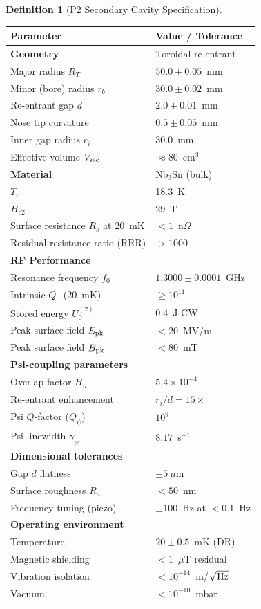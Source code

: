 \documentclass[11pt,twocolumn]{article}
\newcommand{\gpsi}{\gamma_\psi}
\newcommand{\ee}[1]{\times 10^{#1}}
\newcommand{\Qpsi}{Q_\psi}
\newcommand{\Heff}{H_n}
\theoremstyle{definition}
\newtheorem{definition}[theorem]{Definition}
\theoremstyle{remark}
\begin{document}
\begin{definition}[P2 Secondary Cavity Specification]
\label{def:p2_secondary}
\begin{center}
\renewcommand{\arraystretch}{1.2}
\begin{tabular}{@{}p{3.5cm}p{4.5cm}@{}}
\toprule
Parameter & Value / Tolerance \\
\midrule
\textbf{Geometry} & Toroidal re-entrant \\
Major radius $R_T$ & $50.0 \pm 0.05$~mm \\
Minor (bore) radius $r_b$ & $30.0 \pm 0.02$~mm \\
Re-entrant gap $d$ & $2.0 \pm 0.01$~mm \\
Nose tip curvature & $0.5 \pm 0.05$~mm \\
Inner gap radius $r_i$ & $30.0$~mm \\
Effective volume $V_{\rm sec}$ & $\approx 80$~cm$^3$ \\
\midrule
\textbf{Material} & Nb$_3$Sn (bulk) \\
$T_c$ & 18.3~K \\
$H_{c2}$ & 29~T \\
Surface resistance $R_s$ at 20~mK & $< 1$~n$\Omega$ \\
Residual resistance ratio (RRR) & $> 1000$ \\
\midrule
\textbf{RF Performance} & \\
Resonance frequency $f_0$ & $1.3000 \pm 0.0001$~GHz \\
Intrinsic $Q_0$ (20~mK) & $\geq 10^{11}$ \\
Stored energy $U_0^{(2)}$ & $0.4$~J CW \\
Peak surface field $E_{\rm pk}$ & $< 20$~MV/m \\
Peak surface field $B_{\rm pk}$ & $< 80$~mT \\
\midrule
\textbf{Psi-coupling parameters} & \\
Overlap factor $\Heff$ & $5.4\ee{-4}$ \\
Re-entrant enhancement & $r_i/d = 15\times$ \\
Psi $Q$-factor ($\Qpsi$) & $10^9$ \\
Psi linewidth $\gpsi$ & $8.17$~s$^{-1}$ \\
\midrule
\textbf{Dimensional tolerances} & \\
Gap $d$ flatness & $\pm 5~\mu$m \\
Surface roughness $R_a$ & $< 50$~nm \\
Frequency tuning (piezo) & $\pm 100$~Hz at $< 0.1$~Hz \\
\midrule
\textbf{Operating environment} & \\
Temperature & $20 \pm 0.5$~mK (DR) \\
Magnetic shielding & $< 1$~$\mu$T residual \\
Vibration isolation & $< 10^{-14}$~m/$\sqrt{\rm Hz}$ \\
Vacuum & $< 10^{-10}$~mbar \\
\bottomrule
\end{tabular}
\end{center}
\end{definition}
\end{document}
